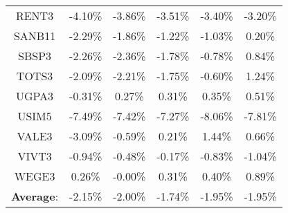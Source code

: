 {\begin{table}[htbp]
\begin{center}
\begin{tabular}{|c|c|c|c|c|c|}
RENT3 &-4.10\%&-3.86\%&-3.51\%&-3.40\%&-3.20\%\\ 
SANB11 &-2.29\%&-1.86\%&-1.22\%&-1.03\%&0.20\%\\ 
SBSP3 &-2.26\%&-2.36\%&-1.78\%&-0.78\%&0.84\%\\ 
TOTS3 &-2.09\%&-2.21\%&-1.75\%&-0.60\%&1.24\%\\ 
UGPA3 &-0.31\%&0.27\%&0.31\%&0.35\%&0.51\%\\ 
USIM5 &-7.49\%&-7.42\%&-7.27\%&-8.06\%&-7.81\%\\ 
VALE3 &-3.09\%&-0.59\%&0.21\%&1.44\%&0.66\%\\ 
VIVT3 &-0.94\%&-0.48\%&-0.17\%&-0.83\%&-1.04\%\\ 
WEGE3 &0.26\%&-0.00\%&0.31\%&0.40\%&0.89\%\\ 
\hline\textbf{Average}: &-2.15\%&-2.00\%&-1.74\%&-1.95\%&-1.95\%\\ 
\hline
\end{tabular}
\label{tab1}
\end{center}
\end{table}
}
